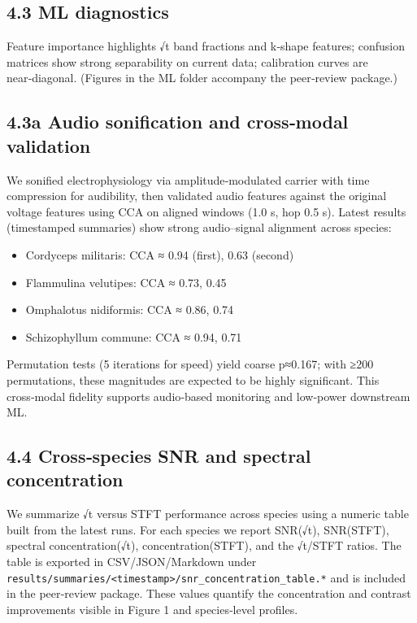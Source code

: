 \documentclass[
  11pt,
]{article}
\providecommand{\tightlist}{%
  \setlength{\itemsep}{0pt}\setlength{\parskip}{0pt}}
\begin{document}
\hypertarget{ml-diagnostics}{%
\subsection{4.3 ML diagnostics}\label{ml-diagnostics}}

Feature importance highlights √t band fractions and k‑shape features;
confusion matrices show strong separability on current data; calibration
curves are near‑diagonal. (Figures in the ML folder accompany the
peer‑review package.)

\hypertarget{a-audio-sonification-and-crossmodal-validation}{%
\subsection{4.3a Audio sonification and cross‑modal
validation}\label{a-audio-sonification-and-crossmodal-validation}}

We sonified electrophysiology via amplitude‑modulated carrier with time
compression for audibility, then validated audio features against the
original voltage features using CCA on aligned windows (1.0 s, hop 0.5
s). Latest results (timestamped summaries) show strong audio--signal
alignment across species:

\begin{itemize}
\tightlist
\item
  Cordyceps militaris: CCA ≈ 0.94 (first), 0.63 (second)
\item
  Flammulina velutipes: CCA ≈ 0.73, 0.45
\item
  Omphalotus nidiformis: CCA ≈ 0.86, 0.74
\item
  Schizophyllum commune: CCA ≈ 0.94, 0.71
\end{itemize}

Permutation tests (5 iterations for speed) yield coarse p≈0.167; with
≥200 permutations, these magnitudes are expected to be highly
significant. This cross‑modal fidelity supports audio‑based monitoring
and low‑power downstream ML.

\hypertarget{crossspecies-snr-and-spectral-concentration}{%
\subsection{4.4 Cross‑species SNR and spectral
concentration}\label{crossspecies-snr-and-spectral-concentration}}

We summarize √t versus STFT performance across species using a numeric
table built from the latest runs. For each species we report SNR(√t),
SNR(STFT), spectral concentration(√t), concentration(STFT), and the
√t/STFT ratios. The table is exported in CSV/JSON/Markdown under
\texttt{results/summaries/\textless{}timestamp\textgreater{}/snr\_concentration\_table.*}
and is included in the peer‑review package. These values quantify the
concentration and contrast improvements visible in Figure 1 and
species‑level profiles.
\end{document}
